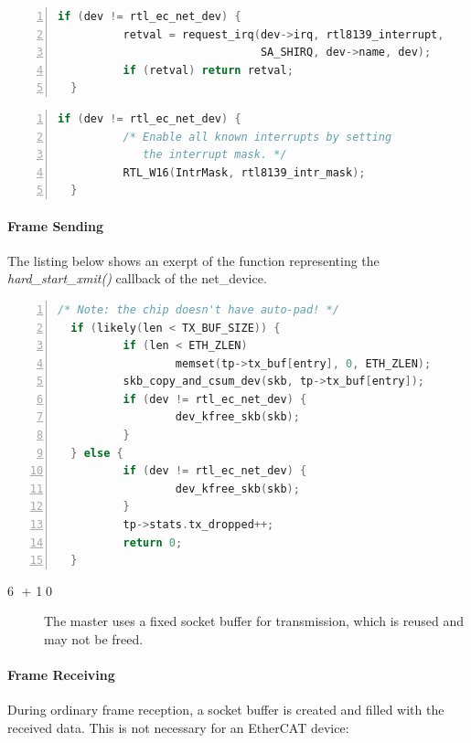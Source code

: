 \documentclass[a4paper,12pt,BCOR6mm,bibtotoc,idxtotoc]{scrbook}
\begin{document}
\begin{lstlisting}[language=C,numbers=left]
  if (dev != rtl_ec_net_dev) {
          retval = request_irq(dev->irq, rtl8139_interrupt,
                               SA_SHIRQ, dev->name, dev);
          if (retval) return retval;
  }
\end{lstlisting}

\begin{lstlisting}[language=C,numbers=left]
  if (dev != rtl_ec_net_dev) {
          /* Enable all known interrupts by setting
             the interrupt mask. */
          RTL_W16(IntrMask, rtl8139_intr_mask);
  }
\end{lstlisting}

\paragraph{Frame Sending}

The listing below shows an exerpt of the function representing the
\textit{hard\_start\_xmit()} callback of the net\_device.

\begin{lstlisting}[language=C,numbers=left]
  /* Note: the chip doesn't have auto-pad! */
  if (likely(len < TX_BUF_SIZE)) {
          if (len < ETH_ZLEN)
                  memset(tp->tx_buf[entry], 0, ETH_ZLEN);
          skb_copy_and_csum_dev(skb, tp->tx_buf[entry]);
          if (dev != rtl_ec_net_dev) {
                  dev_kfree_skb(skb);
          }
  } else {
          if (dev != rtl_ec_net_dev) {
                  dev_kfree_skb(skb);
          }
          tp->stats.tx_dropped++;
          return 0;
  }
\end{lstlisting}

\begin{description}
\item[\normalfont\textcircled{\tiny 6} + \textcircled{\tiny 10}] The
  master uses a fixed socket buffer for transmission, which is reused
  and may not be freed.
\end{description}

\paragraph{Frame Receiving}

During ordinary frame reception, a socket buffer is created and filled
with the received data. This is not necessary for an EtherCAT device:
\end{document}
